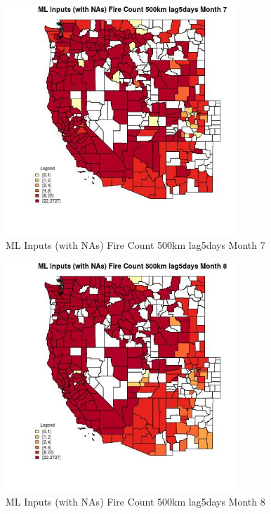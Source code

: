 \begin{figure} 
\centering  
\includegraphics[width=0.77\textwidth]{Code_Outputs/Report_ML_input_PM25_Step4_part_f_de_duplicated_aveswNAs_CountyFire_Count_500km_lag5daysmedianMonth7.jpg} 
\caption{\label{fig:Report_ML_input_PM25_Step4_part_f_de_duplicated_aveswNAsCountyFire_Count_500km_lag5daysmedianMonth7}ML Inputs (with NAs) Fire Count 500km lag5days Month 7} 
\end{figure} 
 

\begin{figure} 
\centering  
\includegraphics[width=0.77\textwidth]{Code_Outputs/Report_ML_input_PM25_Step4_part_f_de_duplicated_aveswNAs_CountyFire_Count_500km_lag5daysmedianMonth8.jpg} 
\caption{\label{fig:Report_ML_input_PM25_Step4_part_f_de_duplicated_aveswNAsCountyFire_Count_500km_lag5daysmedianMonth8}ML Inputs (with NAs) Fire Count 500km lag5days Month 8} 
\end{figure} 
 

